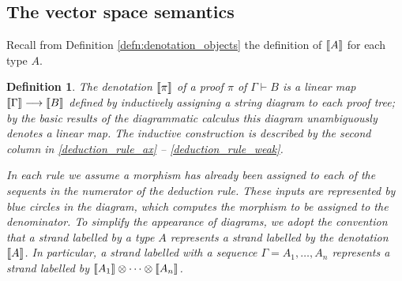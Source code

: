\documentclass[english,letter paper,12pt,reqno]{article}
\theoremstyle{example}
\newtheorem{definition}[theorem]{Definition}
\numberwithin{equation}{section}
\begin{document}
\subsection{The vector space semantics}\label{section:vector_space_sem}

Recall from Definition \ref{defn:denotation_objects} the definition of $\llbracket A \rrbracket$ for each type $A$.

\begin{definition}\label{defn:denotation_morphism} The \emph{denotation} $\llbracket \pi \rrbracket$ of a proof $\pi$ of $\Gamma \vdash B$ is a linear map $\llbracket \Gamma \rrbracket \longrightarrow \llbracket B \rrbracket$ defined by inductively assigning a string diagram to each proof tree; by the basic results of the diagrammatic calculus \cite{JSGoTCI} this diagram unambiguously denotes a linear map. The inductive construction is described by the second column in \eqref{deduction_rule_ax} -- \eqref{deduction_rule_weak}. 

In each rule we assume a morphism has already been assigned to each of the sequents in the numerator of the deduction rule. These inputs are represented by blue circles in the diagram, which computes the morphism to be assigned to the denominator. To simplify the appearance of diagrams, we adopt the convention that a strand labelled by a type $A$ represents a strand labelled by the denotation $\llbracket A \rrbracket$. In particular, a strand labelled with a sequence $\Gamma = A_1,\ldots,A_n$ represents a strand labelled by $\llbracket A_1 \rrbracket \otimes \cdots \otimes \llbracket A_n \rrbracket$.
\end{definition}
\end{document}
